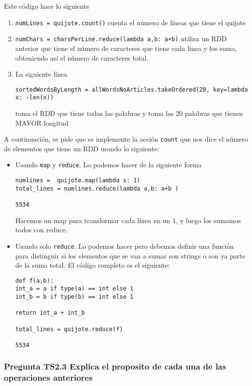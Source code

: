 \documentclass[11pt]{article}
\def\inline{\lstinline[basicstyle=\ttfamily,keywordstyle={}]}
\begin{document}
Este código hace lo siguiente
\begin{enumerate}
\item \inline{numLines = quijote.count()} cuenta el número de líneas que tiene el quijote
\item \inline{numChars = charsPerLine.reduce(lambda a,b: a+b)} utiliza un RDD anterior que tiene el número de caracteres que tiene cada línea y los suma, obteniendo así el número de caracteres total.
\item La siguiente línea
\begin{verbatim}
sortedWordsByLength = allWordsNoArticles.takeOrdered(20, key=lambda x: -len(x))
\end{verbatim} 
toma el RDD que tiene todas las palabras y toma las 20 palabras que tienen MAYOR longitud
\end{enumerate}

A continuación, se pide que se implemente la acción \inline{count} que nos dice el número de elementos que tiene un RDD usando lo siguiente:
\begin{itemize}
	\item Usando \inline{map} y \inline{reduce}. Lo podemos hacer de la siguiente forma
	\begin{verbatim}
numlines =  quijote.map(lambda s: 1)
total_lines = numlines.reduce(lambda a,b: a+b )

5534
	\end{verbatim}
	
	Hacemos un map para transformar cada línea en un $1$, y luego los sumamos todos con reduce.
	
	\item Usando solo \inline{reduce}. Lo podemos hacer pero debemos definir una función para distinguir si los elementos que se van a sumar son strings o son ya parte de la suma total. El código completo es el siguiente:
	\begin{verbatim}
def f(a,b):
int_a = a if type(a) == int else 1
int_b = b if type(b) == int else 1

return int_a + int_b

total_lines = quijote.reduce(f)

5534
	\end{verbatim}

\end{itemize}

\subsubsection*{ Pregunta TS2.3 Explica el proposito de cada una de las operaciones anteriores}
\end{document}
